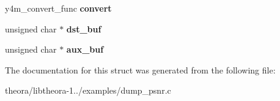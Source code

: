\begin{DoxyCompactItemize}
\item 
\hypertarget{structy4m__input_aade5759c46f2e84a7ead9fd06f745cfe}{y4m\+\_\+convert\+\_\+func {\bfseries convert}}\label{structy4m__input_aade5759c46f2e84a7ead9fd06f745cfe}

\item 
\hypertarget{structy4m__input_a813f97ba1104da3c551f138661c1d5a3}{unsigned char $\ast$ {\bfseries dst\+\_\+buf}}\label{structy4m__input_a813f97ba1104da3c551f138661c1d5a3}

\item 
\hypertarget{structy4m__input_a4fc9cdcd0bd7e3634809778315332cd2}{unsigned char $\ast$ {\bfseries aux\+\_\+buf}}\label{structy4m__input_a4fc9cdcd0bd7e3634809778315332cd2}

\end{DoxyCompactItemize}


The documentation for this struct was generated from the following file\+:\begin{DoxyCompactItemize}
\item 
theora/libtheora-\/1../examples/dump\+\_\+psnr.\+c\end{DoxyCompactItemize}
